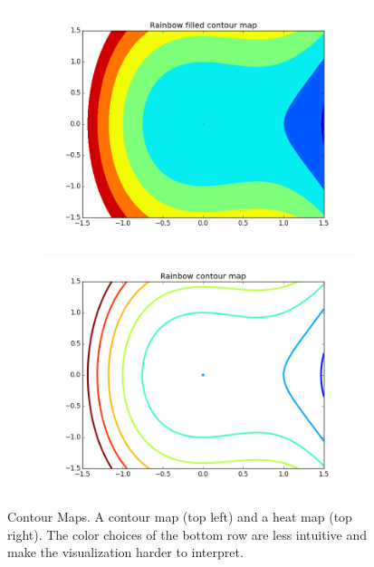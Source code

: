 \begin{figure}[h]
\begin{subfigure}{.45\textwidth}
\end{subfigure}
\begin{subfigure}{.45\textwidth}
\centering
\includegraphics[width=\textwidth]{contour_map_rainbow_filled.png}
\end{subfigure}
\begin{subfigure}{.45\textwidth}
\centering
\includegraphics[width=\textwidth]{contour_map_rainbow.png}
\end{subfigure}
\caption{Contour Maps.  A contour map (top left) and a heat map (top right).
The color choices of the bottom row are less intuitive and make the visualization harder to interpret.}
\label{fig:contour}
\end{figure}


